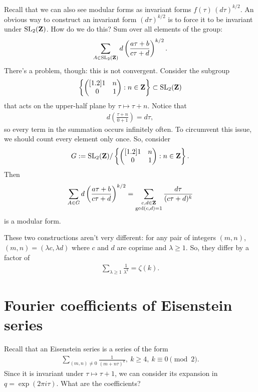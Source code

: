 \documentclass[11pt, oneside,margin=1in]{article}
\begin{document}
Recall that we can also see modular forms as invariant forms $f(\tau)\,  (d\tau)^{k/2}$. An obvious way to construct an invariant form $(d\tau)^{k/2}$ is to force it to be invariant under $\operatorname{SL}_{2}(\mathbf Z)$. How do we do this? Sum over all elements of the group:
\begin{align*}
	\sum_{A \in \operatorname{SL}_{2}(\mathbf Z)}^{} d\left( \frac{a\tau+b}{c\tau+d} \right) ^{k/2}. 
\end{align*}
There's a problem, though: this is not convergent. Consider the subgroup
\begin{align*}
	\left\{ \begin{pmatrix} [ 1.2 ] 1&n\\0&1\end{pmatrix} : n\in \mathbf Z \right\} \subset \operatorname{SL}_{2}(\mathbf Z)
\end{align*}
that acts on the upper-half plane by $\tau \longmapsto \tau + n$. Notice that
\begin{align*}
	d\left( \frac{\tau+n}{0+1} \right) = d\tau,
\end{align*}
so every term in the summation occurs infinitely often. To circumvent this issue, we should count every element only once. So, consider 
\begin{align*}
	G := \operatorname{SL}_{2}(\mathbf Z) /  \left\{ \begin{pmatrix} [ 1.2 ] 1&n\\0&1\end{pmatrix} : n\in \mathbf Z \right\}.
\end{align*}
Then
\begin{align*}
	\sum_{A\in G}^{} d\left( \frac{a\tau+b}{c\tau+d} \right) ^{k/2} = \sum_{\substack{c,d\in \mathbf Z \\ \gcd(c,d)=1}}^{} \frac{d\tau}{(c\tau+d)^k} 
\end{align*}
is a modular form.

These two constructions aren't very different: for any pair of integers $(m,n)$, $(m,n) =  (\lambda c, \lambda d)$ where $c$ and $d$ are coprime and $\lambda\ge 1$. So, they differ by a factor of 
\begin{align*}
	\sum_{\lambda\ge 1}^{} \frac{1}{\lambda^k} = \zeta(k).
\end{align*}
\section{Fourier coefficients of Eisenstein series}
Recall that an Eisenstein series is a series of the form
\begin{align*}
	\sum_{(m,n) \ne 0}^{} \frac{1}{(m+n\tau) ^k},\ k \ge 4,\ k\equiv 0 \pmod 2.
\end{align*}
Since it is invariant under $\tau \longmapsto \tau + 1$, we can consider its expansion in $q = \exp(2\pi i \tau)$. What are the coefficients?
\end{document}
